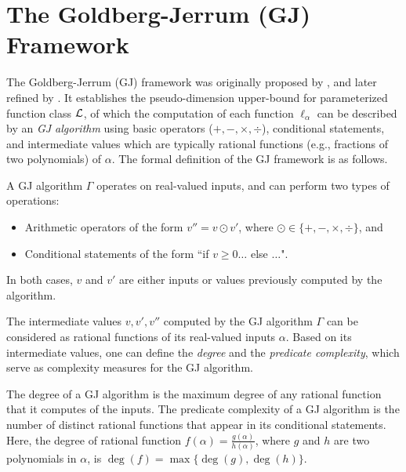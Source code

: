 \appendix

\onecolumn


\section{The Goldberg-Jerrum (GJ) Framework} \label{apx:gj-framework}
The Goldberg-Jerrum (GJ) framework was originally proposed by \citet{goldberg1993bounding}, and later refined by \citet{bartlett2022generalization}. It establishes the pseudo-dimension upper-bound for parameterized function class $\mathcal{L}$, of which the computation of each function $\ell_{\alpha}$ can be described by an \textit{GJ algorithm} using basic operators ($+, -, \times, \div$), conditional statements, and intermediate values which are typically rational functions (e.g., fractions of two polynomials) of $\alpha$. The formal definition of the GJ framework is as follows.

\begin{definition}
    \label{def:GJ-algorithm}
     A GJ algorithm $\Gamma$ operates on real-valued inputs, and can perform two types of operations:
    \begin{itemize}
        \item Arithmetic operators of the form $v'' = v \odot v'$, where $\odot \in \{ +, -, \times, \div\}$, and
        \item Conditional statements of the form ``if  $v \geq 0 \ldots$ else $\ldots$".
    \end{itemize}
    In both cases, $v$ and $v'$ are either inputs or values previously computed by the algorithm.
\end{definition}

The intermediate values $v, v', v''$ computed by the GJ algorithm $\Gamma$ can be considered as rational functions of its real-valued inputs $\alpha$. Based on its intermediate values, one can define the \textit{degree} and the \textit{predicate complexity}, which serve as complexity measures for the GJ algorithm.

\begin{definition}
    \label{definition:gj-algorithm-complexities}
     The degree of a GJ algorithm is the maximum degree of any rational function that it computes of the inputs. The predicate complexity of a GJ algorithm is the number of distinct rational functions that appear in its conditional statements. Here, the degree of rational function $f(\alpha) = \frac{g(\alpha)}{h(\alpha)}$, where $g$ and $h$ are two polynomials in $\alpha$, is $\deg(f) = \max\{\deg(g), \deg(h)\}$.
\end{definition}

